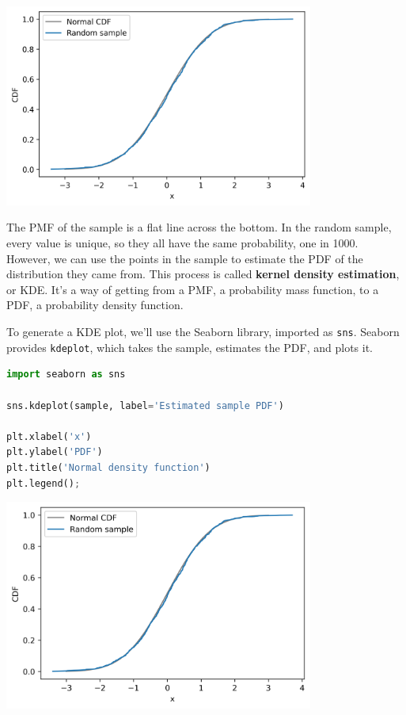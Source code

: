 \begin{center}
\includegraphics[width=4in]{chapters/08_distributions_files/08_distributions_113_0.png}
\end{center}

The PMF of the sample is a flat line across the bottom. In the random
sample, every value is unique, so they all have the same probability,
one in 1000. However, we can use the points in the sample to estimate
the PDF of the distribution they came from. This process is called
\textbf{kernel density estimation}, or KDE. It's a way of getting from a
PMF, a probability mass function, to a PDF, a probability density
function.

To generate a KDE plot, we'll use the Seaborn library, imported as
\passthrough{\lstinline!sns!}. Seaborn provides
\passthrough{\lstinline!kdeplot!}, which takes the sample, estimates the
PDF, and plots it.

\begin{lstlisting}[language=Python,style=source]
import seaborn as sns

sns.kdeplot(sample, label='Estimated sample PDF')

plt.xlabel('x')
plt.ylabel('PDF')
plt.title('Normal density function')
plt.legend();
\end{lstlisting}

\begin{center}
\includegraphics[width=4in]{chapters/08_distributions_files/08_distributions_115_0.png}
\end{center}

